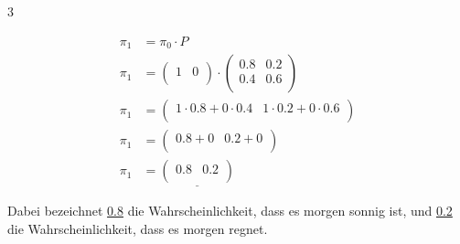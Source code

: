 \begin{landscape}
\begin{multicols*}{3}
\begin{cheatSheetBox}[title=Vorhersage von Zuständen]
      \[\begin{aligned}
          \pi_1 & = \pi_0 \cdot P                               \\
          \pi_1 & =
          \begin{pmatrix}
            1 & 0 \\
          \end{pmatrix}
          \cdot
          \begin{pmatrix}
            0.8 & 0.2 \\
            0.4 & 0.6 \\
          \end{pmatrix}                                        \\
          \pi_1 & =
          \begin{pmatrix}
            1 \cdot 0.8 + 0 \cdot 0.4 & 1 \cdot 0.2 + 0 \cdot 0.6 \\
          \end{pmatrix} \\
          \pi_1 & =
          \begin{pmatrix}
            0.8 + 0 & 0.2 + 0 \\
          \end{pmatrix}                                     \\
          \pi_1 & =
          \underline{
              \begin{pmatrix}
                0.8 & 0.2 \\
              \end{pmatrix}
            }
        \end{aligned}\]

      Dabei bezeichnet \underline{0.8} die Wahrscheinlichkeit, dass es morgen sonnig ist, und \underline{0.2} die Wahrscheinlichkeit, dass es morgen regnet.


\end{cheatSheetBox}
\end{multicols*}
\end{landscape}
